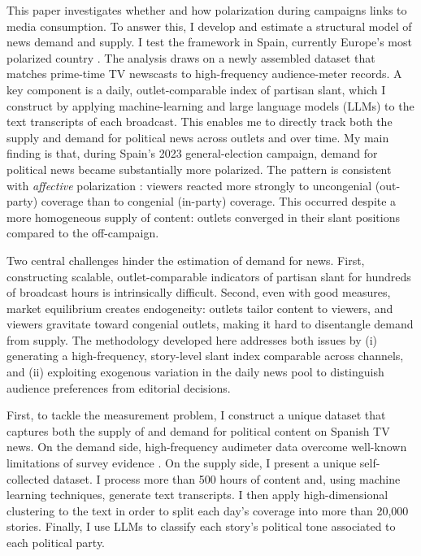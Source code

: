 \documentclass[12pt]{article}
\begin{document}
This paper investigates whether and how polarization during campaigns links to media consumption. To answer this, I develop and estimate a structural model of news demand and supply. I test the framework in Spain, currently Europe’s most  polarized country \citep{edelman_trust_2023}. The analysis draws on a newly assembled dataset that matches prime-time TV newscasts to high-frequency audience-meter records. A key component is a daily, outlet-comparable index of partisan slant, which I construct by applying machine-learning and large language models (LLMs) to the text transcripts of each broadcast. This enables me to directly track both the supply and demand for political news across outlets and over time. My main finding is that, during Spain’s 2023 general-election campaign, demand for political news became substantially more polarized. The pattern is consistent with \textit{affective} polarization \citep{iyengar_affective}: viewers reacted more strongly to uncongenial (out-party) coverage than to congenial (in-party) coverage. This occurred despite a more homogeneous supply of content: outlets converged in their slant positions compared to the off-campaign. 



Two central challenges hinder the estimation of demand for news. First, constructing scalable, outlet-comparable indicators of partisan slant for hundreds of broadcast hours is intrinsically difficult. Second, even with good measures, market equilibrium creates endogeneity: outlets tailor content to viewers, and viewers gravitate toward congenial outlets, making it hard to disentangle demand from supply. The methodology developed here addresses both issues by (i) generating a high-frequency, story-level slant index comparable across channels, and (ii) exploiting exogenous variation in the daily news pool to distinguish audience preferences from editorial decisions.

First, to tackle the measurement problem, I construct a unique dataset that captures both the supply of and demand for political content on Spanish TV news. On the demand side, high-frequency audimeter data overcome well-known limitations of survey evidence \citep{prior}. On the supply side, I present a unique self-collected dataset. I  process more than 500 hours of content and, using machine learning techniques,  generate text transcripts. I then apply high-dimensional clustering to the text in order to split each day’s coverage into more than 20,000 stories. Finally, I use LLMs to classify each story’s political tone associated to each political party. 
\end{document}
